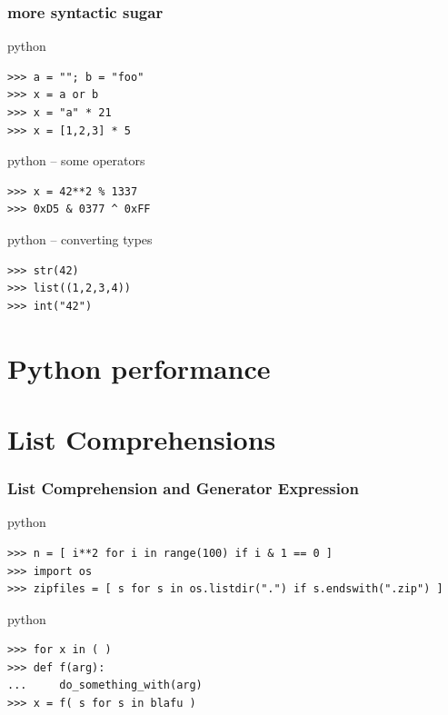 \documentclass{beamer}
\begin{document}
\begin{frame}[fragile]
	\frametitle{more syntactic sugar}

	\begin{exampleblock}{python}
	\begin{lstlisting}
>>> a = ""; b = "foo"
>>> x = a or b
>>> x = "a" * 21
>>> x = [1,2,3] * 5
	\end{lstlisting}
	\end{exampleblock}

	\begin{exampleblock}{python -- some operators}
	\begin{lstlisting}
>>> x = 42**2 % 1337
>>> 0xD5 & 0377 ^ 0xFF
	\end{lstlisting}
	\end{exampleblock}	
	
	\begin{exampleblock}{python -- converting types}
	\begin{lstlisting}
>>> str(42)
>>> list((1,2,3,4))
>>> int("42")	
	\end{lstlisting}
	\end{exampleblock}
\end{frame}


\section{Python performance}	%

\section{List Comprehensions}	%

\begin{frame}[fragile]
	\frametitle{List Comprehension and Generator Expression}
	\begin{exampleblock}{python}
	\begin{lstlisting}
>>> n = [ i**2 for i in range(100) if i & 1 == 0 ]
>>> import os
>>> zipfiles = [ s for s in os.listdir(".") if s.endswith(".zip") ]
	\end{lstlisting}
	\end{exampleblock}
	
	\begin{exampleblock}{python}
	\begin{lstlisting}
>>> for x in ( )
>>> def f(arg):
...     do_something_with(arg)
>>> x = f( s for s in blafu )
	\end{lstlisting}
	\end{exampleblock}
\end{frame}
\end{document}
